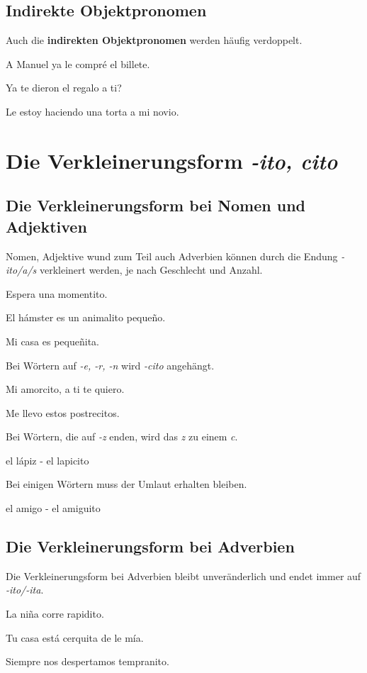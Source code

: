 \subsection*{Indirekte Objektpronomen}
Auch die \textbf{indirekten Objektpronomen} werden häufig
verdoppelt.
\begin{ejemplos}
    \item A Manuel ya le compr\'e el billete.
    \item Ya te dieron el regalo a ti?
    \item Le estoy haciendo una torta a mi novio.
\end{ejemplos}
\section{Die Verkleinerungsform \textit{-ito, cito}}
\subsection*{Die Verkleinerungsform bei Nomen und Adjektiven}
Nomen, Adjektive wund zum Teil auch Adverbien können durch
die Endung \textit{-ito/a/s} verkleinert werden, je nach Geschlecht 
und Anzahl.
\begin{ejemplos}
    \item Espera una momentito.
    \item El h\'amster es un animalito peque\~no.
    \item Mi casa es peque\~nita.
\end{ejemplos}
Bei Wörtern auf \textit{-e, -r, -n} wird \textit{-cito}
angehängt.
\begin{ejemplos}
    \item Mi amorcito, a ti te quiero.
    \item Me llevo estos postrecitos.
\end{ejemplos}
Bei Wörtern, die auf \textit{-z} enden, wird das \textit{z} zu
einem \textit{c}.
\begin{ejemplos}
    \item el l\'apiz - el lapicito
\end{ejemplos}
Bei einigen Wörtern muss der Umlaut erhalten bleiben.
\begin{ejemplos}
    \item el amigo - el amiguito
\end{ejemplos}
\subsection*{Die Verkleinerungsform bei Adverbien}
Die Verkleinerungsform bei Adverbien bleibt unveränderlich
und endet immer auf \textit{-ito/-ita}.
\begin{ejemplos}
    \item La ni\~na corre rapidito.
    \item Tu casa est\'a cerquita de le m\'ia.
    \item Siempre nos despertamos tempranito.
\end{ejemplos}
